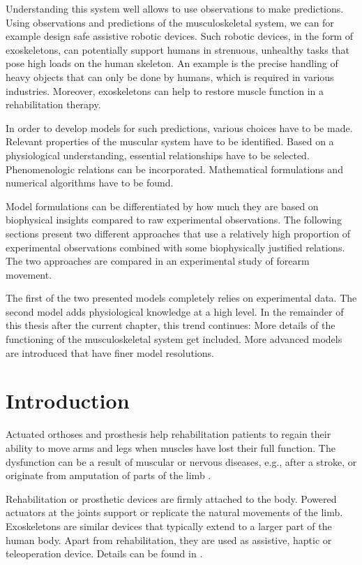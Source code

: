 Understanding this system well allows to use observations to make predictions.
Using observations and predictions of the musculoskeletal system, we can for example design safe assistive robotic devices.
Such robotic devices, in the form of exoskeletons, can potentially support humans in strenuous, unhealthy tasks that pose high loads on the human skeleton. An example is the precise handling of heavy objects that can only be done by humans, which is required in various industries. Moreover, exoskeletons can help to restore muscle function in a rehabilitation therapy.

In order to develop models for such predictions, various choices have to be made. 
Relevant properties of the muscular system have to be identified. Based on a physiological understanding, essential relationships have to be selected. Phenomenologic relations can be incorporated. Mathematical formulations and numerical algorithms have to be found.

Model formulations can be differentiated by how much they are based on biophysical insights compared to raw experimental observations. The following sections present two different approaches that use a relatively high proportion of experimental observations combined with some biophysically justified relations. The two approaches are compared in an experimental study of forearm movement. 

The first of the two presented models completely relies on experimental data. The second model adds physiological knowledge at a high level. In the remainder of this thesis after the current chapter, this trend continues: More details of the functioning of the musculoskeletal system get included. More advanced models are introduced that have finer model resolutions.

\section{Introduction}
Actuated orthoses and prosthesis help rehabilitation patients to regain their ability to move arms and legs when muscles have lost their full function. The dysfunction can be a result of muscular or nervous diseases, e.g., after a stroke, or originate from amputation of parts of the limb \cite{Krebs2002, Zhang2018}.

Rehabilitation or prosthetic devices are firmly attached to the body. Powered actuators at the joints support or replicate the natural movements of the limb.
Exoskeletons are similar devices that typically extend to a larger part of the human body. Apart from rehabilitation, they are used as assistive, haptic or teleoperation device. Details can be found in \cite{Perry2007}.

